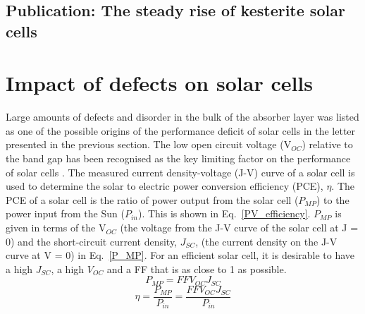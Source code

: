 \documentclass[11pt, twoside]{report}
\begin{document}
\subsection{Publication: The steady rise of kesterite solar cells}






\section{Impact of defects on {\CZTS} solar cells}\label{CZTS_defects_lit}
Large amounts of defects and disorder in the bulk of the absorber layer was listed as one of the possible origins of the performance deficit of {\CZTS} solar cells in the letter presented in the previous section.
The low open circuit voltage (V$_{OC}$) relative to the band gap has been recognised as the key limiting factor on the performance of {\CZTS} solar cells \cite{culprit}. 
The measured current density-voltage (J-V) curve of a solar cell is used to determine the solar to electric power conversion efficiency (PCE), $\eta$. The PCE of a solar cell is the ratio of power output from the solar cell ($P_{MP}$) to the power input from the Sun ($P_{in}$). This is shown in Eq.~\ref{PV_efficiency}. $P_{MP}$ is given in terms of the V$_{OC}$ (the voltage from the J-V curve of the solar cell at J = 0) and the short-circuit current density, $J_{SC}$, (the current density on the J-V curve at V = 0) in Eq.~\ref{P_MP}.
For an efficient solar cell, it is desirable to have a high $J_{SC}$, a high $V_{OC}$ and a FF that is as close to 1 as possible.
\begin{equation} \label{P_MP}
P_{MP} = FFV_{OC}J_{SC}
\end{equation}
\begin{equation} \label{PV_efficiency}
\eta = \frac{P_{MP}}{P_{in}} = \frac{FFV_{OC}J_{SC}}{P_{in}}
\end{equation}
\end{document}
